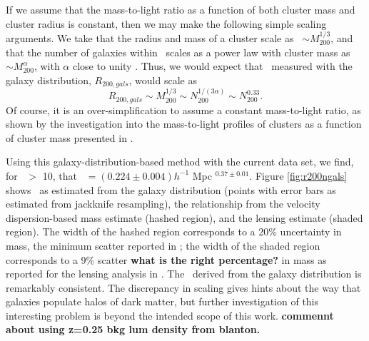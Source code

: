 \documentclass{emulateapj}
\begin{document}
If we assume that the mass-to-light ratio as a function of both cluster mass and cluster radius is constant, then we may make the following simple scaling arguments. We take that the radius and mass of a cluster scale as \rtwo\ $\sim M_{200}^{1/3}$, and that the number of galaxies within \rtwo\ scales as a power law
with cluster mass as \Ntwo\ $\sim M_{200}^{\alpha}$, with $\alpha$ close to unity \citep[e.g.,][]{Kravtsov04a,
  LinMohr04, Zehavi04, Wechsler}. Thus, we would expect that \rtwo\ measured with the galaxy distribution, $R_{200, gals}$, would scale as
\begin{equation}
R_{200, gals} \sim
M_{200}^{1/3} \sim
N_{200}^{1/(3\alpha)} \sim
N_{200}^{0.33}.
\end{equation}
Of course, it is an over-simplification to assume a constant mass-to-light ratio, as shown by the investigation into the mass-to-light profiles of clusters as a function of cluster mass presented in \citet{Sheldon07b}.



Using this galaxy-distribution-based method with the current data set, we find, for \Ntwo\ $>$ 10, that \rtwo\ $= (0.224 \pm 0.004) h^{-1}$ Mpc \Ntwo$^{0.37 \pm 0.01}$. Figure \ref{fig:r200ngals} shows \rtwo\ as estimated from the galaxy distribution (points with error bars as estimated from jackknife resampling), the relationship from the velocity dispersion-based mass estimate (hashed region), and the lensing estimate (shaded region). The width of the hashed region corresponds to a 20\% uncertainty in mass, the minimum scatter reported in \citet{Becker07}; the width of the shaded region corresponds to a 9\% scatter {\bf what is the right percentage?} in mass as reported for the lensing analysis in \citet{Johnston07b}. The \rtwo\ derived from the galaxy distribution is remarkably consistent. The discrepancy in scaling gives hints about the way that galaxies populate halos of dark matter, but further investigation of this interesting problem is beyond the intended scope of this work. {\bf commennt about using z=0.25 bkg lum density from blanton.}


\end{document}
